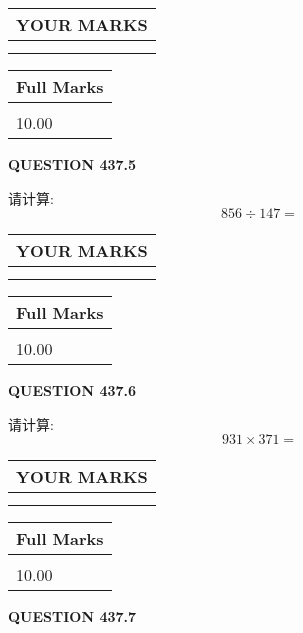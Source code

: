 \documentclass{ctexart}
\begin{document}
\noindent\begin{tabular}{|l|}
\hline
 YOUR MARKS  \\
\hline
 \\ 
 \\ 
\hline
\end{tabular}
\hspace{0.05in} \begin{tabular}{|l|}
\hline
 Full Marks  \\
\hline
 \\ 
10.00 \\
\hline
\end{tabular}
{\textbf{\Large{QUESTION
437.5 
}}}
  
  
 
请计算:
\begin{equation}
856  \div    %
147 = \nonumber
\end{equation}
 

 

 
  
\vspace{0.2in}
  
\noindent\begin{tabular}{|l|}
\hline
 YOUR MARKS  \\
\hline
 \\ 
 \\ 
\hline
\end{tabular}
\hspace{0.05in} \begin{tabular}{|l|}
\hline
 Full Marks  \\
\hline
 \\ 
10.00 \\
\hline
\end{tabular}
{\textbf{\Large{QUESTION
437.6 
}}}
  
  
 
请计算:
\begin{equation}
931  \times    %
371 = \nonumber
\end{equation}
 

 

 
  
\vspace{0.2in}
  
\noindent\begin{tabular}{|l|}
\hline
 YOUR MARKS  \\
\hline
 \\ 
 \\ 
\hline
\end{tabular}
\hspace{0.05in} \begin{tabular}{|l|}
\hline
 Full Marks  \\
\hline
 \\ 
10.00 \\
\hline
\end{tabular}
{\textbf{\Large{QUESTION
437.7 
}}}
  
\end{document}
